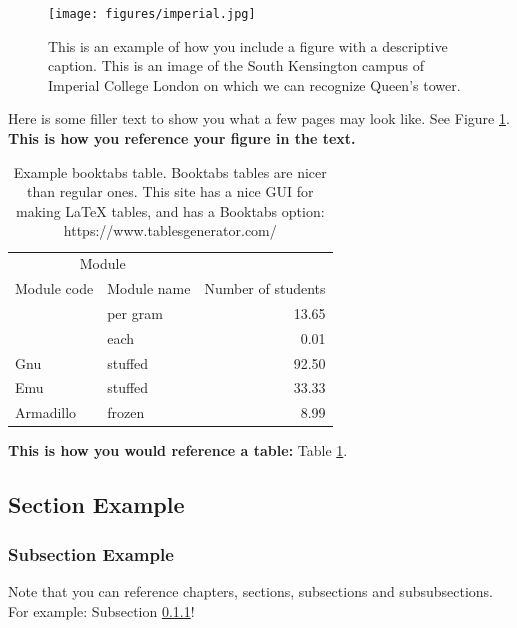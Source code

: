 \documentclass[a4paper,11pt, titlepage]{article}
\theoremstyle{definition}
\theoremstyle{plain}
\theoremstyle{remark}
\begin{document}
\begin{figure}[b!] %
    \centering
    \texttt{[image: figures/imperial.jpg]}
    \caption{This is an example of how you include a figure with a descriptive caption. This is an image of the South Kensington campus of Imperial College London on which we can recognize Queen's tower.}
    \label{fig:imperial-picture}
\end{figure}

Here is some filler text to show you what a few pages may look like. \lipsum[2-4] See Figure \ref{fig:imperial-picture}. \textbf{This is how you reference your figure in the text.}

\begin{table}[]
    \centering
    \begin{tabular}{llr}  
        \toprule
        \multicolumn{2}{c}{Module} \\
        \cmidrule(r){1-2}
        Module code    & Module name & Number of students \\
        \midrule
              & per gram    & 13.65      \\
                      &    each     & 0.01       \\
        Gnu       & stuffed     & 92.50      \\
        Emu       & stuffed     & 33.33      \\
        Armadillo & frozen      & 8.99       \\
        \bottomrule
    \end{tabular}
    \caption{Example booktabs table. Booktabs tables are nicer than regular ones. This site has a nice GUI for making LaTeX tables, and has a Booktabs option: https://www.tablesgenerator.com/}
    \label{tab:my_label}
\end{table}

\lipsum[1-4] \textbf{This is how you would reference a table:} Table \ref{tab:my_label}. 

\subsection{Section Example}
\label{sec:sec_example}
\lipsum[1]
\subsubsection{Subsection Example}
\label{sec:subsec_example}
\lipsum[1]

Note that you can reference chapters, sections, subsections and subsubsections. For example: Subsection \ref{sec:subsec_example}!
\end{document}

